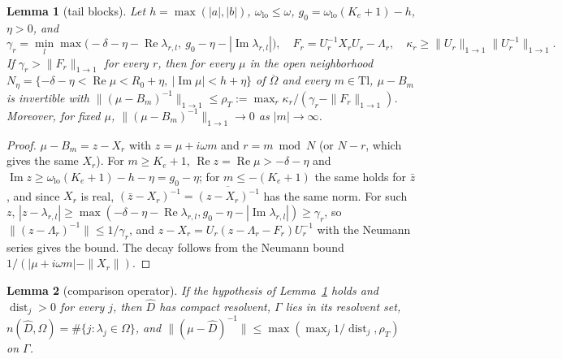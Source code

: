 \documentclass[11pt]{article}
\newtheorem{lemma}{Lemma}[section]
\theoremstyle{definition}
\newcommand{\re}{\operatorname{Re}}
\newcommand{\im}{\operatorname{Im}}
\begin{document}
\begin{lemma}[tail blocks]\label{lem:tail}
Let $h = \max(|a|, |b|)$, $\omega_{\mathrm{lo}} \le \omega$, $g_0 = \omega_{\mathrm{lo}}(K_e + 1) - h$, $\eta > 0$, and
\[ \gamma_r = \min_l\max\big(-\delta - \eta - \re\lambda_{r,l},\ g_0 - \eta - |\im\lambda_{r,l}|\big), \quad F_r = U_r^{-1}X_rU_r - \Lambda_r, \quad \kappa_r \ge \|U_r\|_{1\to1}\|U_r^{-1}\|_{1\to1}. \]
If $\gamma_r > \|F_r\|_{1\to1}$ for every $r$, then for every $\mu$ in the open neighborhood $N_\eta = \{-\delta - \eta < \re\mu < R_0 + \eta,\ |\im\mu| < h + \eta\}$ of $\overline\Omega$ and every $m \in \mathrm{Tl}$, $\mu - B_m$ is invertible with $\|(\mu - B_m)^{-1}\|_{1\to1} \le \rho_T := \max_r\kappa_r/(\gamma_r - \|F_r\|_{1\to1})$. Moreover, for fixed $\mu$, $\|(\mu - B_m)^{-1}\|_{1\to1} \to 0$ as $|m| \to \infty$.
\end{lemma}

\begin{proof}
$\mu - B_m = z - X_r$ with $z = \mu + i\omega m$ and $r = m \bmod N$ (or $N - r$, which gives the same $X_r$). For $m \ge K_e + 1$, $\re z = \re\mu > -\delta - \eta$ and $\im z \ge \omega_{\mathrm{lo}}(K_e + 1) - h - \eta = g_0 - \eta$; for $m \le -(K_e + 1)$ the same holds for $\bar z$, and since $X_r$ is real, $(\bar z - X_r)^{-1} = \overline{(z - X_r)^{-1}}$ has the same norm. For such $z$, $|z - \lambda_{r,l}| \ge \max(-\delta - \eta - \re\lambda_{r,l}, g_0 - \eta - |\im\lambda_{r,l}|) \ge \gamma_r$, so $\|(z - \Lambda_r)^{-1}\| \le 1/\gamma_r$, and $z - X_r = U_r(z - \Lambda_r - F_r)U_r^{-1}$ with the Neumann series gives the bound. The decay follows from the Neumann bound $1/(|\mu + i\omega m| - \|X_r\|)$.
\end{proof}

\begin{lemma}[comparison operator]\label{lem:compare}
If the hypothesis of Lemma~\ref{lem:tail} holds and $\operatorname{dist}_j > 0$ for every $j$, then $\hat D$ has compact resolvent, $\Gamma$ lies in its resolvent set, $n(\hat D, \Omega) = \#\{j : \lambda_j \in \Omega\}$, and $\|(\mu - \hat D)^{-1}\| \le \max(\max_j 1/\operatorname{dist}_j, \rho_T)$ on $\Gamma$.
\end{lemma}
\end{document}
